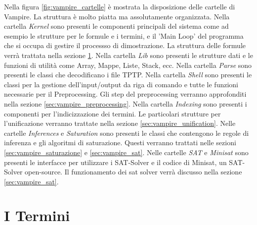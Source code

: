 \documentclass[./main.tex]{subfiles}
\begin{document}
Nella figura \ref{fig:vampire_cartelle} è mostrata la disposizione delle cartelle di Vampire.
La struttura è molto piatta ma assolutamente organizzata.
Nella cartella \textit{Kernel} sono presenti le componenti principali del sistema come ad esempio le strutture per le formule e i termini,
e il 'Main Loop' del programma che si occupa di gestire il processso di dimostrazione.
La struttura delle formule verrà trattata nella sezione \ref{sec:vampire_term}.
Nella cartella \textit{Lib} sono presenti le strutture dati e le funzioni di utilità come Array, Mappe, Liste, Stack, ecc.
Nella cartella \textit{Parse} sono presenti le classi che decodificano 
i file TPTP. 
Nella cartella \textit{Shell} sono presenti le classi per la gestione dell'input/output da riga di comando
e tutte le funzioni necessarie per il Preprocessing.
Gli step del preprocessing verranno approfonditi nella sezione \ref{sec:vampire_preprocessing}.
Nella cartella \textit{Indexing} sono presenti i componenti per l'indicizzazione dei termini.
Le particolari strutture per l'unificazione verranno trattate nella sezione \ref{sec:vampire_unification}.
Nelle cartelle \textit{Inferences} e \textit{Saturation} sono presenti le classi che contengono le regole di inferenza
e gli algoritmi di saturazione. Questi verranno trattati nelle sezioni \ref{sec:vampire_saturazione} e \ref{sec:vampire_sat}.
Nelle cartelle \textit{SAT} e \textit{Minisat} sono presenti le interfacce per utilizzare i SAT-Solver e
il codice di Minisat, un SAT-Solver open-source. 
Il funzionamento dei sat solver verrà discusso nella sezione \ref{sec:vampire_sat}.


\section{I Termini} \label{sec:vampire_term}
\end{document}

